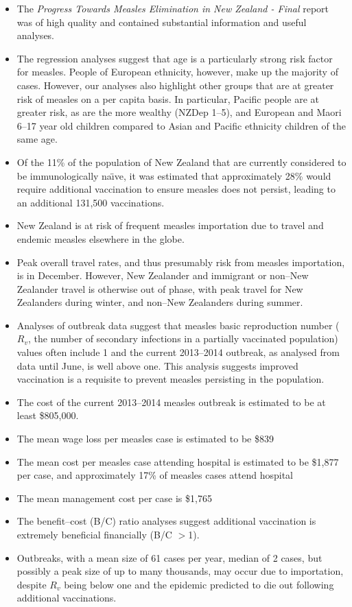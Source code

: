 \documentclass{article}
\begin{document}
\begin{itemize}
\item The \emph {Progress Towards Measles Elimination in New Zealand - Final} report was of high quality and contained substantial information and useful analyses.
\item The regression analyses suggest that age is a particularly strong risk factor for measles.  People of European ethnicity, however, make up the majority of cases. However, our analyses also highlight other groups that are at greater risk of measles on a per capita basis. In particular, Pacific people are at greater risk, as are the more wealthy (NZDep 1--5), and European and Maori 6--17 year old children compared to Asian and Pacific ethnicity children of the same age.
\item Of the 11\% of the population of New Zealand that are currently considered to be immunologically na\"{\i}ve, it was estimated that approximately 28\% would require additional vaccination to ensure measles does not persist, leading to an additional 131,500 vaccinations.
\item New Zealand is at risk of frequent measles importation due to travel and endemic measles elsewhere in the globe.
\item Peak overall travel rates, and thus presumably risk from measles importation, is in December. However, New Zealander and immigrant or non--New Zealander travel is otherwise out of phase, with peak travel for New Zealanders during winter, and non--New Zealanders during summer.
\item Analyses of outbreak data suggest that measles basic reproduction number ($R_v$, the number of secondary infections in a partially vaccinated population) values often include 1 and the current 2013--2014 outbreak, as analysed from data until June, is well above one. This analysis suggests improved vaccination is a requisite to prevent measles persisting in the population.
\item The cost of the current 2013--2014 measles outbreak is estimated to be at least \$805,000.
\item The mean wage loss per measles case is estimated to be \$839
\item The mean cost per measles case attending hospital is estimated to be \$1,877 per case, and approximately 17\% of measles cases attend hospital
\item The mean management cost per case is \$1,765
\item The benefit--cost (B/C) ratio analyses suggest additional vaccination is extremely beneficial financially (B/C $>$1).
\item Outbreaks, with a mean size of 61 cases per year, median of 2 cases, but possibly a peak size of up to many thousands, may occur due to importation, despite $R_v$ being below one and the epidemic predicted to die out following additional vaccinations.
\end{itemize}
\end{document}
